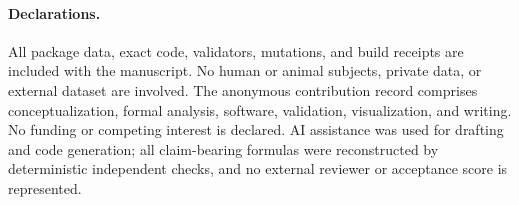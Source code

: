 \documentclass[10pt]{article}
\begin{document}
\paragraph{Declarations.}
All package data, exact code, validators, mutations, and build receipts are
included with the manuscript.  No human or animal subjects, private data, or
external dataset are involved.  The anonymous contribution record comprises
conceptualization, formal analysis, software, validation, visualization, and
writing.  No funding or competing interest is declared.  AI assistance was
used for drafting and code generation; all claim-bearing formulas were
reconstructed by deterministic independent checks, and no external reviewer
or acceptance score is represented.
\end{document}
